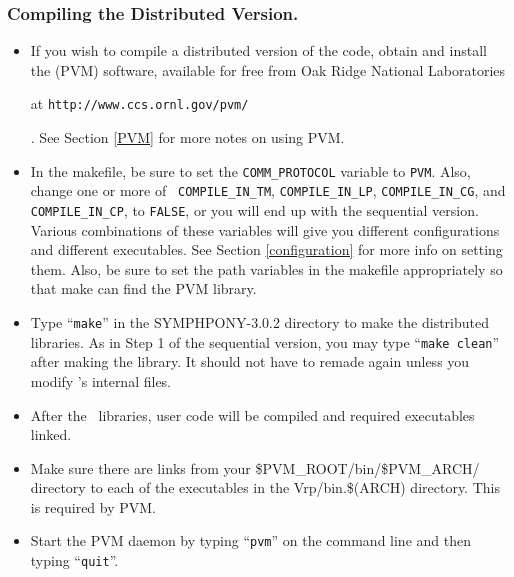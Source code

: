 \subsubsection{Compiling the Distributed Version.}

\begin{itemize}
        \item If you wish to compile a distributed version of the code, obtain
and install the {\em {}} (PVM) software, available for free
from Oak Ridge National Laboratories
\begin{latexonly}
        at {\tt http://www.ccs.ornl.gov/pvm/}
\end{latexonly}. 
        See Section \ref{PVM} for more notes on using PVM.
        
        \item In the makefile, be sure to set the {\tt COMM\_PROTOCOL}
        variable to {\tt PVM}. Also, change one or more of {\tt
        COMPILE\_IN\_TM}, {\tt COMPILE\_IN\_LP}, {\tt COMPILE\_IN\_CG}, and
        {\tt COMPILE\_IN\_CP}, to {\tt FALSE}, or you will end up with the
        sequential version. Various combinations of these variables will give
        you different configurations and different executables. See Section
        \ref{configuration} for more info on setting them. Also, be sure to
        set the path variables in the makefile appropriately so that make can
        find the PVM library.

        \item Type ``{\tt make}'' in the SYMPHPONY-3.0.2 directory to
        make the distributed libraries. As in Step 1 of the sequential
        version, you may type ``{\tt make clean}'' after making the
        library. It should not have to remade again unless you modify
        \BB's internal files.

        \item After the \BB\ libraries, user code will be compiled and
        required executables linked.

        \item Make sure there are links from your
        \$PVM\_ROOT/bin/\$PVM\_ARCH/ directory to each of the
        executables in the Vrp/bin.\$(ARCH) directory. This is required
        by PVM.

        \item Start the PVM daemon by typing ``{\tt pvm}'' on the command line
        and then typing ``{\tt quit}''.


\end{itemize}
